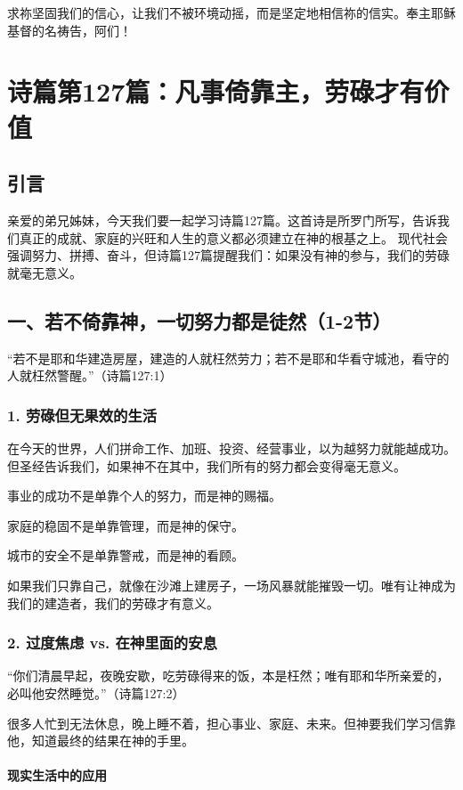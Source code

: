 \documentclass[a4paper, 12pt]{article}
\begin{document}
求祢坚固我们的信心，让我们不被环境动摇，而是坚定地相信祢的信实。奉主耶稣基督的名祷告，阿们！
\newpage
\section{诗篇第127篇：凡事倚靠主，劳碌才有价值}
\subsection*{引言}
亲爱的弟兄姊妹，今天我们要一起学习诗篇127篇。这首诗是所罗门所写，告诉我们真正的成就、家庭的兴旺和人生的意义都必须建立在神的根基之上。
现代社会强调努力、拼搏、奋斗，但诗篇127篇提醒我们：如果没有神的参与，我们的劳碌就毫无意义。
\subsection*{一、若不倚靠神，一切努力都是徒然（1-2节）}
“若不是耶和华建造房屋，建造的人就枉然劳力；若不是耶和华看守城池，看守的人就枉然警醒。”（诗篇127:1）

\subsubsection*{1. 劳碌但无果效的生活}
在今天的世界，人们拼命工作、加班、投资、经营事业，以为越努力就能越成功。但圣经告诉我们，如果神不在其中，我们所有的努力都会变得毫无意义。

事业的成功不是单靠个人的努力，而是神的赐福。

家庭的稳固不是单靠管理，而是神的保守。

城市的安全不是单靠警戒，而是神的看顾。

如果我们只靠自己，就像在沙滩上建房子，一场风暴就能摧毁一切。唯有让神成为我们的建造者，我们的劳碌才有意义。

\subsubsection*{2. 过度焦虑 vs. 在神里面的安息}
“你们清晨早起，夜晚安歇，吃劳碌得来的饭，本是枉然；唯有耶和华所亲爱的，必叫他安然睡觉。”（诗篇127:2）

很多人忙到无法休息，晚上睡不着，担心事业、家庭、未来。但神要我们学习信靠他，知道最终的结果在神的手里。

\paragraph*{现实生活中的应用}
\end{document}
